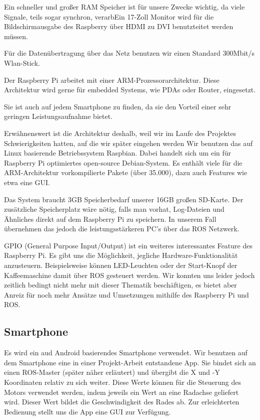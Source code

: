 \documentclass[12pt]{article}
\begin{document}
Ein schneller und großer RAM Speicher ist für unsere Zwecke wichtig, da viele Signale, teils sogar synchron, verarbEin 17-Zoll Monitor wird für die Bildschirmausgabe des Raspberry über HDMI zu DVI benutzteitet werden müssen.

Für die Datenübertragung über das Netz benutzen wir einen Standard 300Mbit/s Wlan-Stick.

Der Raspberry Pi arbeitet mit einer ARM-Prozessorarchitektur.
Diese Architektur wird gerne für embedded Systems, wie PDAs oder Router, eingesetzt.

Sie ist auch auf jedem Smartphone zu finden, da sie den Vorteil einer sehr geringen Leistungsaufnahme bietet. 

Erwähnenswert ist die Architektur deshalb, weil wir im Laufe des Projektes Schwierigkeiten hatten, auf die wir später eingehen werden
Wir benutzen das auf Linux basierende Betriebssystem Raspbian.
Dabei handelt sich um ein für Raspberry Pi optimiertes open-source Debian-System.
Es enthält viele für die ARM-Architektur vorkompilierte Pakete (über 35.000), dazu auch Features wie etwa eine GUI.

Das System braucht 3GB Speicherbedarf unserer 16GB großen SD-Karte.
Der zusätzliche Speicherplatz wäre nötig, falls man vorhat, Log-Dateien und Ähnliches direkt auf dem Raspberry Pi zu speichern. 
In unserem Fall übernehmen das jedoch die leistungsstärkeren PC's über das ROS Netzwerk.

GPIO (General Purpose Input/Output) ist ein weiteres interessantes Feature des Raspberry Pi.
Es gibt uns die Möglichkeit, jegliche Hardware-Funktionalität anzusteuern.
Beispielsweise können LED-Leuchten oder der Start-Knopf der Kaffeemaschine damit über ROS gesteuert werden.
Wir konnten uns leider jedoch zeitlich bedingt nicht mehr mit dieser Thematik beschäftigen, es bietet aber Anreiz für noch mehr Ansätze und Umsetzungen mithilfe des Raspberry Pi und ROS.


\subsection{Smartphone}

Es wird ein aud Android basierendes Smartphone verwendet.
Wir benutzen auf dem Smartphone eine in einer Projekt-Arbeit entstandene App.
Sie bindet sich an einen ROS-Master (später näher erläutert) und übergibt die X und -Y Koordinaten relativ zu sich weiter.
Diese Werte können für die Steuerung des Motors verwendet werden, indem jeweils ein Wert an eine Radachse geliefert wird. Dieser Wert bildet die Geschwindigkeit des Rades ab.
Zur erleichterten Bedienung stellt uns die App eine GUI zur Verfügung. 
\end{document}

